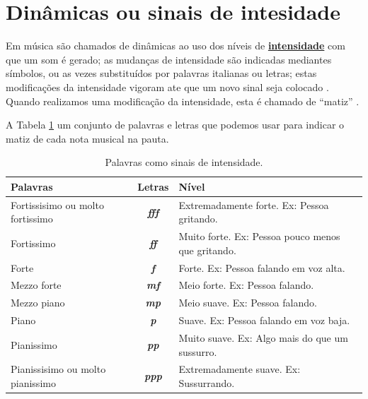 \section{Dinâmicas ou sinais de intesidade}
\label{sec:sinaisintensidade}

Em música são chamados de dinâmicas ao uso dos níveis de 
\hyperref[sec:pos:Intensidade]{\textbf{intensidade}} com que um som é gerado;
as mudanças de intensidade são indicadas mediantes símbolos, 
ou as vezes substituídos por palavras italianas ou letras;
estas modificações da intensidade vigoram ate que um novo sinal seja colocado \cite[pp. 213]{medteoria} \cite[pp. 117]{mascarenhascurso}.
Quando realizamos uma modificação da intensidade, esta é chamado de ``matiz''  \cite[pp. 213]{medteoria}.

A Tabela \ref{tab:palavras:intensidade} um conjunto de palavras e letras que podemos usar 
para indicar o matiz de cada nota musical na pauta. 
\begin{table}[h]
\centering
\begin{tabular}{|p{4cm}|c|p{7cm}|}
\hline
Palavras  & Letras & Nível \\ \hline
\hline 
Fortissisimo ou molto fortissimo  & \textbf{\textit{fff}}   & Extremadamente forte. Ex: Pessoa gritando. \\ \hline
Fortissimo    & \textbf{\textit{ff}}    & Muito forte. Ex: Pessoa pouco menos que gritando. \\  \hline
Forte         & \textbf{\textit{f}}     & Forte. Ex: Pessoa falando em voz alta. \\  \hline
Mezzo forte   & \textbf{\textit{mf}}    & Meio forte. Ex: Pessoa falando.\\  \hline
Mezzo piano   & \textbf{\textit{mp}}    & Meio suave. Ex: Pessoa falando. \\  \hline
Piano         & \textbf{\textit{p}}     & Suave. Ex: Pessoa falando em voz baja. \\  \hline
Pianissimo    & \textbf{\textit{pp}}    & Muito suave. Ex: Algo mais do que um sussurro. \\  \hline
Pianissisimo ou molto pianissimo  & \textbf{\textit{ppp}}   & Extremadamente suave. Ex: Sussurrando. \\  \hline
\end{tabular}
\caption{Palavras como sinais de intensidade.}
\label{tab:palavras:intensidade}
\end{table}

